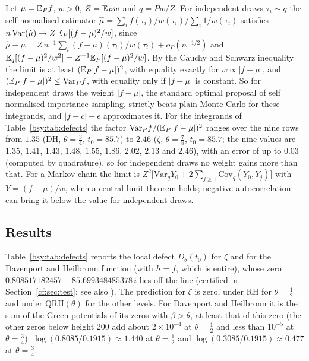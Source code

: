 \begin{remark}\label{bsy:rem:weight}
Let $\mu=\mathbb{E}_Pf$, $w>0$, $Z=\mathbb{E}_Pw$ and $q=Pw/Z$. For independent draws $\tau_i\sim q$ the self normalised estimator $\hat\mu=\sum_if(\tau_i)/w(\tau_i)\big/\sum_i1/w(\tau_i)$ satisfies $n\,\mathrm{Var}(\hat\mu)\to Z\,\mathbb{E}_P[(f-\mu)^2/w]$, since $\hat\mu-\mu=Z\,n^{-1}\sum_i(f-\mu)(\tau_i)/w(\tau_i)+o_P(n^{-1/2})$ and $\mathbb{E}_q[(f-\mu)^2/w^2]=Z^{-1}\mathbb{E}_P[(f-\mu)^2/w]$. By the Cauchy and Schwarz inequality the limit is at least $(\mathbb{E}_P|f-\mu|)^2$, with equality exactly for $w\propto|f-\mu|$, and $(\mathbb{E}_P|f-\mu|)^2\le\mathrm{Var}_Pf$, with equality only if $|f-\mu|$ is constant. So for independent draws the weight $|f-\mu|$, the standard optimal proposal of self normalised importance sampling, strictly beats plain Monte Carlo for these integrands, and $|f-c|+\epsilon$ approximates it. For the integrands of Table~\ref{bsy:tab:defects} the factor $\mathrm{Var}_Pf/(\mathbb{E}_P|f-\mu|)^2$ ranges over the nine rows from $1.35$ (DH, $\theta=\frac34$, $t_0=85.7$) to $2.46$ ($\zeta$, $\theta=\frac78$, $t_0=85.7$; the nine values are $1.35$, $1.41$, $1.43$, $1.48$, $1.55$, $1.86$, $2.02$, $2.13$ and $2.46$), with an error of up to $0.03$ (computed by quadrature), so for independent draws no weight gains more than that. For a Markov chain the limit is $Z^2\bigl[\mathrm{Var}_qY_0+2\sum_{j\ge1}\mathrm{Cov}_q(Y_0,Y_j)\bigr]$ with $Y=(f-\mu)/w$, when a central limit theorem holds; negative autocorrelation can bring it below the value for independent draws.
\end{remark}

\subsection{Results}

Table~\ref{bsy:tab:defects} reports the local defect $D_\theta(t_0)$ for $\zeta$ and for the Davenport and Heilbronn function (with $h=f$, which is entire), whose zero $0.808517182457+85.699348485378\,i$ lies off the line (certified in Section~\ref{cf:sec:test}; see also \cite{Spira94,BSO07}). The prediction for $\zeta$ is zero, under RH for $\theta=\frac12$ and under $\mathrm{QRH}(\theta)$ for the other levels. For Davenport and Heilbronn it is the sum of the Green potentials of its zeros with $\beta>\theta$, at least that of this zero (the other zeros below height $200$ add about $2\times10^{-4}$ at $\theta=\frac12$ and less than $10^{-5}$ at $\theta=\frac34$): $\log(0.8085/0.1915)\approx1.440$ at $\theta=\frac12$ and $\log(0.3085/0.1915)\approx0.477$ at $\theta=\frac34$.


